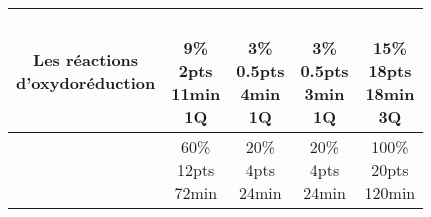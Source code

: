 \documentclass[12pt]{article}
\begin{document}
\begin{center}
\begin{tabular}{|c||c|c|c|c|}
    \makecell{Les réactions \\d’oxydoréduction }
    &\makecell{\\9\%\\2pts\\11min\\1Q}  & \makecell{\\3\%\\0.5pts\\4min\\1Q}  &\makecell{\\3\%\\0.5pts\\3min\\1Q } & \makecell{\\15\%\\18pts\\18min\\3Q} \\\hline
    



    &\makecell{60\%\\12pts\\72min}  & \makecell{20\%\\4pts\\24min}  &\makecell{20\%\\4pts\\24min } & \makecell{100\%\\20pts\\120min} \\\hline

\end{tabular} 
\end{center}

\end{document}

